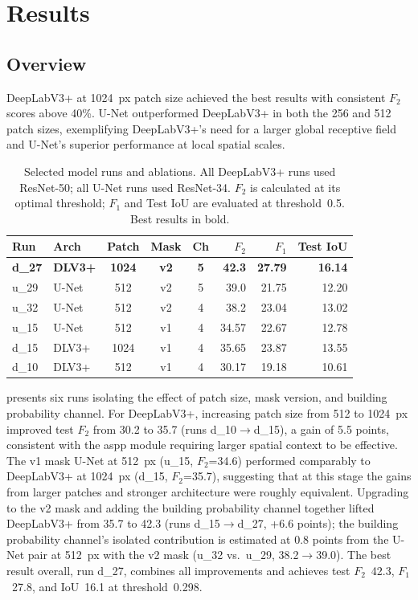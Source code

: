 \chapter{Results}
\label{ch:results}

\section{Overview}
\label{sec:results_overview}

DeepLabV3+ at 1024~px patch size achieved the best results with consistent $F_2$ scores above 40\%. U-Net outperformed DeepLabV3+ in both the 256 and 512 patch sizes, exemplifying DeepLabV3+'s need for a larger global receptive field and U-Net's superior performance at local spatial scales.

\begin{table}[htbp]
  \centering
  \caption{Selected model runs and ablations. All DeepLabV3+ runs used ResNet-50; all U-Net runs used ResNet-34. $F_2$ is calculated at its optimal threshold; $F_1$ and Test IoU are evaluated at threshold~0.5. Best results in bold.}
  \label{tab:selected_runs}
  \begin{tabular}{llcccrrr}
    \toprule
    \textbf{Run} & \textbf{Arch} & \textbf{Patch} & \textbf{Mask} & \textbf{Ch} & \textbf{$F_2$} & \textbf{$F_1$} & \textbf{Test IoU} \\
    \midrule
    \textbf{d\_27} & \textbf{DLV3+} & \textbf{1024} & \textbf{v2} & \textbf{5} & \textbf{42.3} & \textbf{27.79} & \textbf{16.14} \\
    u\_29 & U-Net & 512 & v2 & 5 & 39.0 & 21.75 & 12.20 \\
    u\_32 & U-Net & 512 & v2 & 4 & 38.2 & 23.04 & 13.02 \\
    u\_15 & U-Net & 512 & v1 & 4 & 34.57 & 22.67 & 12.78 \\
    d\_15 & DLV3+ & 1024 & v1 & 4 & 35.65 & 23.87 & 13.55 \\
    d\_10 & DLV3+ & 512 & v1 & 4 & 30.17 & 19.18 & 10.61 \\
    \bottomrule
  \end{tabular}
\end{table}

 presents six runs isolating the effect of patch size, mask version, and building probability channel. For DeepLabV3+, increasing patch size from 512 to 1024~px improved test $F_2$ from 30.2 to 35.7 (runs d\_10$\rightarrow$d\_15), a gain of 5.5 points, consistent with the \acrshort{aspp} module requiring larger spatial context to be effective. The v1 mask U-Net at 512~px (u\_15, $F_2$=34.6) performed comparably to DeepLabV3+ at 1024~px (d\_15, $F_2$=35.7), suggesting that at this stage the gains from larger patches and stronger architecture were roughly equivalent. Upgrading to the v2 mask and adding the building probability channel together lifted DeepLabV3+ from 35.7 to 42.3 (runs d\_15$\rightarrow$d\_27, +6.6 points); the building probability channel's isolated contribution is estimated at 0.8 points from the U-Net pair at 512~px with the v2 mask (u\_32 vs.\ u\_29, 38.2$\rightarrow$39.0). The best result overall, run d\_27, combines all improvements and achieves test $F_2$~42.3, $F_1$~27.8, and IoU~16.1 at threshold~0.298.

